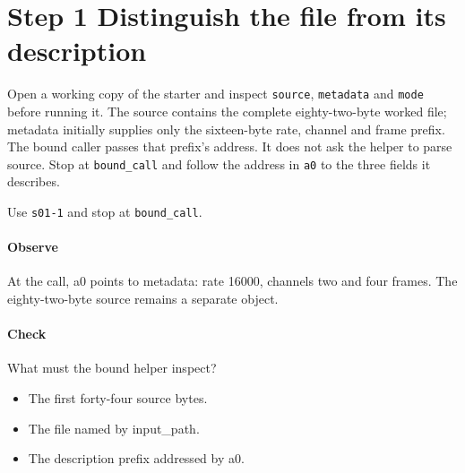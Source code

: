 \section{Step 1 Distinguish the file from its description}\label{pcm-wav-s01}
Open a working copy of the starter and inspect \texttt{source}, \texttt{metadata} and \texttt{mode} before running it. The source contains the complete eighty-two-byte worked file; metadata initially supplies only the sixteen-byte rate, channel and frame prefix. The bound caller passes that prefix's address. It does not ask the helper to parse source. Stop at \texttt{bound\_call} and follow the address in \texttt{a0} to the three fields it describes.

Use \texttt{s01-1} and stop at \texttt{bound\_call}.

\paragraph{Observe} At the call, a0 points to metadata: rate 16000, channels two and four frames. The eighty-two-byte source remains a separate object.

\paragraph{Check} What must the bound helper inspect?
\begin{itemize}
\item[A.] The first forty-four source bytes.
\item[B.] The file named by input\_path.
\item[C.] The description prefix addressed by a0.
\end{itemize}
